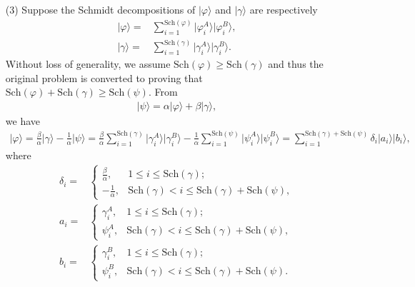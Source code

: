 \documentclass[en]{sol-man}
\begin{document}
\begin{pf}
\begin{itemize}
        \item[(3)] Suppose the Schmidt decompositions of $\lvert\varphi\rangle$ and $\lvert\gamma\rangle$ are respectively
        \begin{align}
            \lvert\varphi\rangle=&\sum_{i=1}^{\text{Sch}(\varphi)}\lvert\varphi_i^A\rangle\lvert\varphi_i^B\rangle,\\
            \lvert\gamma\rangle=&\sum_{i=1}^{\text{Sch}(\gamma)}\lvert\gamma_i^A\rangle\lvert\gamma_i^B\rangle.
        \end{align}
        Without loss of generality, we assume $\text{Sch}(\varphi)\geq\text{Sch}(\gamma)$ and thus the original problem is converted to proving that $\text{Sch}(\varphi)+\text{Sch}(\gamma)\geq\text{Sch}(\psi)$. From
        \begin{align}
            \lvert\psi\rangle=\alpha\lvert\varphi\rangle+\beta\lvert\gamma\rangle,
        \end{align}
        we have
        \begin{align}
            \lvert\varphi\rangle=\frac{\beta}{\alpha}\lvert\gamma\rangle-\frac{1}{\alpha}\lvert\psi\rangle=\frac{\beta}{\alpha}\sum_{i=1}^{\text{Sch}(\gamma)}\lvert\gamma_i^A\rangle\lvert\gamma_i^B\rangle-\frac{1}{\alpha}\sum_{i=1}^{\text{Sch}(\psi)}\lvert\psi_i^A\rangle\lvert\psi_i^B\rangle=\sum_{i=1}^{\text{Sch}(\gamma)+\text{Sch}(\psi)}\delta_i\lvert a_i\rangle\lvert b_i\rangle,
        \end{align}
        where
        \begin{align}
            \delta_i=&\left\{\begin{array}{ll}
                \frac{\beta}{\alpha},&1\leq i\leq\text{Sch}(\gamma);\\
                -\frac{1}{\alpha},&\text{Sch}(\gamma)<i\leq\text{Sch}(\gamma)+\text{Sch}(\psi),
            \end{array}\right.\\
            a_i=&\left\{\begin{array}{ll}
                \gamma_i^A,&1\leq i\leq\text{Sch}(\gamma);\\
                \psi_i^A,&\text{Sch}(\gamma)<i\leq\text{Sch}(\gamma)+\text{Sch}(\psi),
            \end{array}\right.\\
            b_i=&\left\{\begin{array}{ll}
                \gamma_i^B,&1\leq i\leq\text{Sch}(\gamma);\\
                \psi_i^B,&\text{Sch}(\gamma)<i\leq\text{Sch}(\gamma)+\text{Sch}(\psi).

\end{array}
\end{align}
\end{itemize}
\end{pf}
\end{document}
